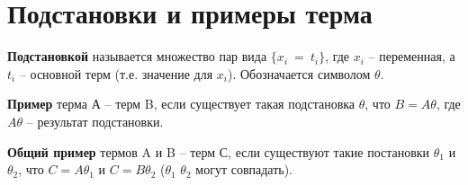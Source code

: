 \section{Подстановки и примеры терма}
\textbf{Подстановкой} называется множество пар вида $\{x_{i}\ =\ t_{i}\}$, где ${x_{i}}$ -- переменная, а $t_{i}$ -- основной терм (т.е. значение для $x_{i}$). Обозначается символом $\theta$.

\textbf{Пример} терма А -- терм B, если существует такая подстановка $\theta$, что $B=A\theta$, где $A\theta$ -- результат подстановки.

\textbf{Общий пример} термов A и B -- терм С, если существуют такие постановки $\theta_{1}$ и $\theta_{2}$, что $C = A\theta_{1}$ и $C = B\theta_{2}$ ($\theta_{1}$ $\theta_{2}$ могут совпадать).